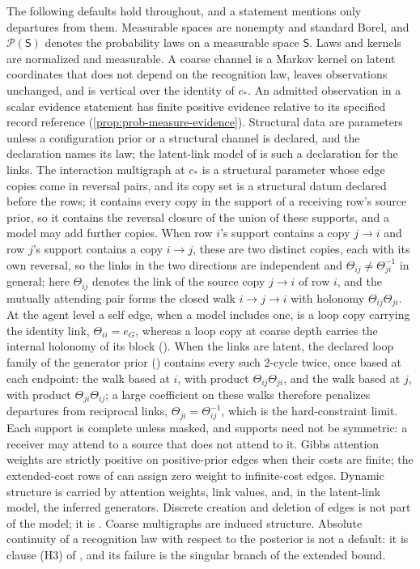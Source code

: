 The following defaults hold throughout, and a statement mentions only departures from them. Measurable spaces
are nonempty and standard Borel, and $\mathcal P(\mathsf S)$ denotes the probability laws on a measurable
space $\mathsf S$. Laws and kernels are normalized and measurable. A coarse channel is a Markov
kernel on latent coordinates that does not depend on the recognition law, leaves observations unchanged, and
is vertical over the identity of $c_*$. An admitted observation in a scalar
evidence statement has finite positive evidence relative to its specified
record reference (\cref{prop:prob-measure-evidence}). Structural data
are parameters unless a configuration prior or a structural channel is declared, and the declaration names
its law; the latent-link model of  is such a declaration for the links. The
interaction multigraph at $c_*$ is a structural parameter whose edge copies come in reversal
pairs, and its copy set is a structural datum declared before the rows; it contains every copy in the
support of a receiving row's source prior, so it contains the reversal closure of the union of these
supports, and a model may add further copies. When row $i$'s support contains a copy $j\to i$ and row
$j$'s support contains a copy $i\to j$, these are two distinct copies, each with its own reversal, so the
links in the two directions are independent and $\Theta_{ij}\neq\Theta_{ji}^{-1}$ in general; here
$\Theta_{ij}$ denotes the link of the source copy $j\to i$ of row $i$, and the mutually attending pair
forms the closed walk $i\to j\to i$ with holonomy $\Theta_{ij}\Theta_{ji}$. At the agent level a self
edge, when a model includes one, is a loop copy carrying the identity link, $\Theta_{ii}=e_G$, whereas a
loop copy at coarse depth carries the internal holonomy of its block
(). When the links are latent, the declared loop family of the
generator prior () contains every such 2-cycle twice, once based at each
endpoint: the walk based at $i$, with product $\Theta_{ij}\Theta_{ji}$, and the walk based at $j$, with
product $\Theta_{ji}\Theta_{ij}$; a large coefficient on these walks therefore penalizes departures from
reciprocal links, $\Theta_{ji}=\Theta_{ij}^{-1}$, which is the hard-constraint limit. Each support is complete unless
masked, and supports need not be symmetric: a receiver may attend to a source that does not attend to it. Gibbs attention weights are strictly positive on positive-prior edges when their
costs are finite; the extended-cost rows of  can assign zero weight to
infinite-cost edges. Dynamic structure is carried by attention weights, link values, and, in the
latent-link model, the inferred generators. Discrete creation and deletion of edges is not part of the
model; it is
. Coarse multigraphs are induced structure. Absolute continuity of a recognition
law with respect to the posterior is not a default: it is clause (H3) of , and
its failure is the singular branch of the extended bound.

